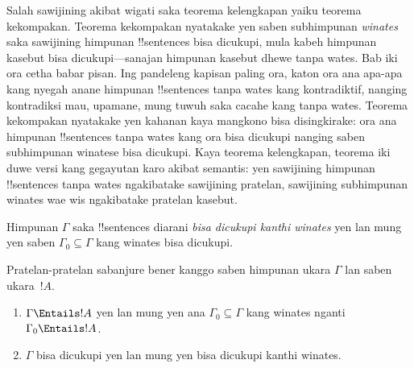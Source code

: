 \documentclass[../../../include/open-logic-section]{subfiles}
\begin{document}
      {}
      {}


Salah sawijining akibat wigati saka teorema kelengkapan yaiku teorema
kekompakan. Teorema kekompakan nyatakake yen saben subhimpunan
\emph{winates} saka sawijining himpunan !!{sentence}s bisa dicukupi,
mula kabeh himpunan kasebut bisa dicukupi---sanajan himpunan kasebut
dhewe tanpa wates. Bab iki ora cetha babar pisan. Ing pandeleng
kapisan paling ora, katon ora ana apa-apa kang nyegah anane himpunan
!!{sentence}s tanpa wates kang kontradiktif, nanging kontradiksi mau,
upamane, mung tuwuh saka cacahe kang tanpa wates. Teorema kekompakan
nyatakake yen kahanan kaya mangkono bisa disingkirake: ora ana
himpunan !!{sentence}s tanpa wates kang ora bisa dicukupi nanging
saben subhimpunan winatese bisa dicukupi. Kaya teorema kelengkapan,
teorema iki duwe versi kang gegayutan karo akibat semantis: yen
sawijining himpunan !!{sentence}s tanpa wates ngakibatake sawijining
pratelan, sawijining subhimpunan winates wae wis ngakibatake pratelan
kasebut.

\begin{defn}
  Himpunan $\Gamma$ saka !!{sentence}s diarani \emph{bisa dicukupi
  kanthi winates} yen lan mung yen saben $\Gamma_0 \subseteq \Gamma$
  kang winates bisa dicukupi.
\end{defn}

\begin{thm}
Pratelan-pratelan sabanjure bener kanggo saben himpunan ukara
$\Gamma$ lan saben ukara~$!A$.
\begin{enumerate}
  \item $\Gamma \Entails !A$ yen lan mung yen ana $\Gamma_0
    \subseteq \Gamma$ kang winates nganti $\Gamma_0 \Entails !A$.
  \item $\Gamma$ bisa dicukupi yen lan mung yen bisa dicukupi kanthi
    winates.
\end{enumerate}
\end{thm}
\end{document}
